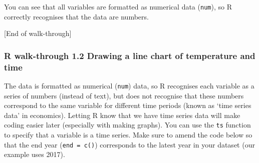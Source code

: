 \documentclass[
]{article}
\begin{document}
You can see that all variables are formatted as numerical data
(\texttt{num}), so R correctly recognises that the data are numbers.

{[}End of walk-through{]}

\subsubsection{R walk-through 1.2 Drawing a line chart of temperature
and
time}\label{r-walk-through-1.2-drawing-a-line-chart-of-temperature-and-time}

The data is formatted as numerical (\texttt{num}) data, so R recognises
each variable as a series of numbers (instead of text), but does not
recognise that these numbers correspond to the same variable for
different time periods (known as `time series data' in economics).
Letting R know that we have time series data will make coding easier
later (especially with making graphs). You can use the \texttt{ts}
function to specify that a variable is a time series. Make sure to amend
the code below so that the end year (\texttt{end\ =\ c()}) corresponds
to the latest year in your dataset (our example uses 2017).
\end{document}
